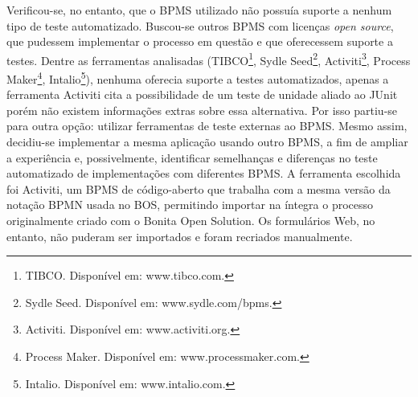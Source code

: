 \documentclass[12pt]{article}
\begin{document}
Verificou-se, no entanto, que o BPMS utilizado não possuía suporte a nenhum tipo de teste automatizado. Buscou-se outros BPMS com licenças \emph{open source}, que pudessem implementar o processo em questão e que oferecessem suporte a testes. Dentre as ferramentas analisadas (TIBCO\footnote{TIBCO. Disponível em: www.tibco.com.}, Sydle Seed\footnote{Sydle Seed. Disponível em: www.sydle.com/bpms.}, Activiti\footnote{Activiti. Disponível em: www.activiti.org.}, Process Maker\footnote{Process Maker. Disponível em: www.processmaker.com.}, Intalio\footnote{Intalio. Disponível em: www.intalio.com.}), nenhuma oferecia suporte a testes automatizados, apenas a ferramenta Activiti cita a possibilidade de um teste de unidade aliado ao JUnit porém não existem informações extras sobre essa alternativa. Por isso partiu-se para outra opção: utilizar ferramentas de teste externas ao BPMS. Mesmo assim, decidiu-se implementar a mesma aplicação usando outro BPMS, a fim de ampliar a experiência e, possivelmente, identificar semelhanças e diferenças no teste automatizado de implementações com diferentes BPMS.
A ferramenta escolhida foi Activiti, um BPMS de código-aberto que trabalha com a mesma versão da notação BPMN usada no BOS, permitindo importar na íntegra o processo originalmente criado com o Bonita Open Solution. Os formulários Web, no entanto, não puderam ser importados e foram recriados manualmente.






\end{document}
